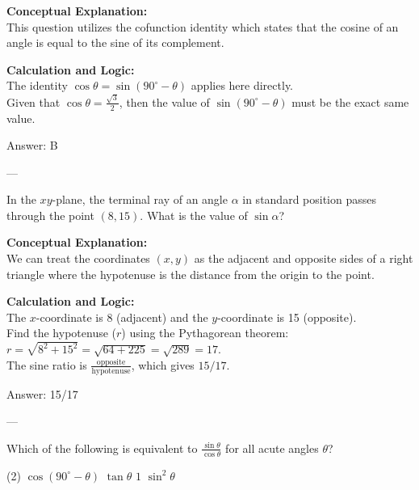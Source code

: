 \documentclass[11pt,paper=a4,answers]{exam}
\begin{document}
\begin{questions}
\begin{solution}
\textbf{Conceptual Explanation:} \\
This question utilizes the cofunction identity which states that the cosine of an angle is equal to the sine of its complement.

\vspace{10pt}
\textbf{Calculation and Logic:} \\
The identity $\cos \theta = \sin(90^\circ - \theta)$ applies here directly. \\
Given that $\cos \theta = \frac{\sqrt{3}}{2}$, then the value of $\sin(90^\circ - \theta)$ must be the exact same value.

\vspace{15pt}
Answer: \colorbox{yellow!100}{B}
\end{solution}

---

\question
In the $xy$-plane, the terminal ray of an angle $\alpha$ in standard position passes through the point $(8, 15)$. What is the value of $\sin \alpha$?

\begin{solution}
\textbf{Conceptual Explanation:} \\
We can treat the coordinates $(x, y)$ as the adjacent and opposite sides of a right triangle where the hypotenuse is the distance from the origin to the point.

\vspace{10pt}
\textbf{Calculation and Logic:} \\
The $x$-coordinate is 8 (adjacent) and the $y$-coordinate is 15 (opposite). \\
Find the hypotenuse ($r$) using the Pythagorean theorem: $r = \sqrt{8^2 + 15^2} = \sqrt{64 + 225} = \sqrt{289} = 17$. \\
The sine ratio is $\frac{\text{opposite}}{\text{hypotenuse}}$, which gives $15/17$.

\vspace{15pt}
Answer: \colorbox{yellow!100}{15/17}
\end{solution}

---

\question
Which of the following is equivalent to $\frac{\sin \theta}{\cos \theta}$ for all acute angles $\theta$?
\begin{tasks}(2)
    \task $\cos(90^\circ - \theta)$
    \task $\tan \theta$
    \task $1$
    \task $\sin^2 \theta$
\end{tasks}


\end{questions}
\end{document}
